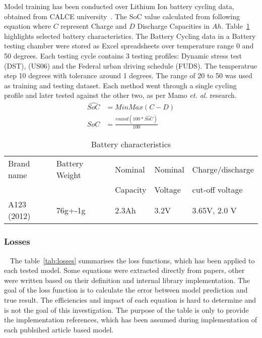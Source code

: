 Model training has been conducted over Lithium Ion battery cycling data, obtained from CALCE university~\cite{noauthor_calce_2017}.
The SoC value calculated from following equation where $C$ represent Charge and $D$ Discharge Capacities in $Ah$.
Table~\ref{tab:battery} highlights selected battery characteristics.
The Battery Cycling data in a Battery testing chamber were stored as Excel spreadsheets over temperature range 0 and 50 degrees.
Each testing cycle contains 3 testing profiles: Dynamic stress test (DST), (US06) and the Federal urban driving schedule (FUDS).
The temperatrue step 10 degrees with tolerance around 1 degrees.
The range of 20 to 50 was used as training and testing dataset.
Each method went through a single cycling profile and later tested against the other two, as per Mamo \textit{et. al.} \cite{mamo_long_2020} research.
\begin{equation}
    \begin{split}
        \hat{SoC} &= MinMax(C-D) \\
        SoC &= \frac{round(100*\hat{SoC})}{100}
    \end{split}
\end{equation}
\begin{table}[ht]
    \centering
    \caption{Battery characteristics}
    \label{tab:battery}
    \begin{tabular}{ p{2.7cm} p{2.7cm} p{2.7cm} p{2.7cm} p{2.7cm}   }
        \hline
        Brand name & Battery Weight & Nominal  & Nominal & Charge/discharge\\
                   &                & Capacity & Voltage & cut-off voltage \\
        \hline
        A123 (2012) & 76g+-1g & 2.3Ah & 3.2V & 3.65V, 2.0 V\\
        \hline
    \end{tabular}
\end{table}
\subsubsection{Losses}~\label{subsub:losses}
The table~\ref{tab:losses} summarises the loss functions, which has been applied to each tested model.
Some equations were extracted directly from papers, other were written based on their definition and internal library implementation.
The goal of the loss function is to calculate the error between model prediction and true result.
The efficiencies and impact of each equation is hard to determine and is not the goal of this investigation.
The purpose of the table is only to provide the implementation references, which has been assumed during implementation of each publsihed article based model.

